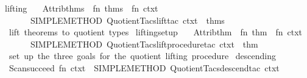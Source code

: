\begin{isabellebody}
\endisatagML
{\isafoldML}%
%
\isadelimML
%
\endisadelimML
\isanewline
\isanewline
{}\isamarkupfalse%
%
\isadelimdocument
%
\endisadelimdocument
%
\isatagdocument
%
\isamarkuptrue%
%
\endisatagdocument
{\isafolddocument}%
%
\isadelimdocument
%
\endisadelimdocument
%
\isadelimML
%
\endisadelimML
%
\isatagML
{}\isamarkupfalse%
\ lifting\ {\isacharequal}{\kern0pt}\isanewline
\ \ {\isacartoucheopen}Attrib{\isachardot}{\kern0pt}thms\ {\isachargreater}{\kern0pt}{\isachargreater}{\kern0pt}\ {\isacharparenleft}{\kern0pt}fn\ thms\ {\isacharequal}{\kern0pt}{\isachargreater}{\kern0pt}\ fn\ ctxt\ {\isacharequal}{\kern0pt}{\isachargreater}{\kern0pt}\isanewline
\ \ \ \ \ \ \ SIMPLE{\isacharunderscore}{\kern0pt}METHOD{\isacharprime}{\kern0pt}\ {\isacharparenleft}{\kern0pt}Quotient{\isacharunderscore}{\kern0pt}Tacs{\isachardot}{\kern0pt}lift{\isacharunderscore}{\kern0pt}tac\ ctxt\ {\isacharbrackleft}{\kern0pt}{\isacharbrackright}{\kern0pt}\ thms{\isacharparenright}{\kern0pt}{\isacharparenright}{\kern0pt}{\isacartoucheclose}\isanewline
\ \ {\isacartoucheopen}lift\ theorems\ to\ quotient\ types{\isacartoucheclose}\isanewline
\isanewline
{}\isamarkupfalse%
\ lifting{\isacharunderscore}{\kern0pt}setup\ {\isacharequal}{\kern0pt}\isanewline
\ \ {\isacartoucheopen}Attrib{\isachardot}{\kern0pt}thm\ {\isachargreater}{\kern0pt}{\isachargreater}{\kern0pt}\ {\isacharparenleft}{\kern0pt}fn\ thm\ {\isacharequal}{\kern0pt}{\isachargreater}{\kern0pt}\ fn\ ctxt\ {\isacharequal}{\kern0pt}{\isachargreater}{\kern0pt}\isanewline
\ \ \ \ \ \ \ SIMPLE{\isacharunderscore}{\kern0pt}METHOD{\isacharprime}{\kern0pt}\ {\isacharparenleft}{\kern0pt}Quotient{\isacharunderscore}{\kern0pt}Tacs{\isachardot}{\kern0pt}lift{\isacharunderscore}{\kern0pt}procedure{\isacharunderscore}{\kern0pt}tac\ ctxt\ {\isacharbrackleft}{\kern0pt}{\isacharbrackright}{\kern0pt}\ thm{\isacharparenright}{\kern0pt}{\isacharparenright}{\kern0pt}{\isacartoucheclose}\isanewline
\ \ {\isacartoucheopen}set\ up\ the\ three\ goals\ for\ the\ quotient\ lifting\ procedure{\isacartoucheclose}\isanewline
\isanewline
{}\isamarkupfalse%
\ descending\ {\isacharequal}{\kern0pt}\isanewline
\ \ {\isacartoucheopen}Scan{\isachardot}{\kern0pt}succeed\ {\isacharparenleft}{\kern0pt}fn\ ctxt\ {\isacharequal}{\kern0pt}{\isachargreater}{\kern0pt}\ SIMPLE{\isacharunderscore}{\kern0pt}METHOD{\isacharprime}{\kern0pt}\ {\isacharparenleft}{\kern0pt}Quotient{\isacharunderscore}{\kern0pt}Tacs{\isachardot}{\kern0pt}descend{\isacharunderscore}{\kern0pt}tac\ ctxt\ {\isacharbrackleft}{\kern0pt}{\isacharbrackright}{\kern0pt}{\isacharparenright}{\kern0pt}{\isacharparenright}{\kern0pt}{\isacartoucheclose}\isanewline

\end{isabellebody}

